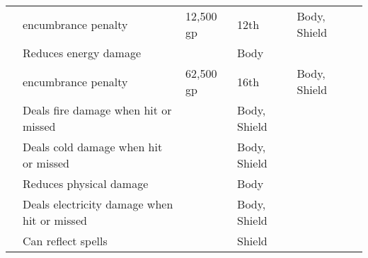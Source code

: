 \begin{longtabuwrapper}
\begin{longtabu}{l X l l l l}
                  &  encumbrance penalty & 12,500 gp & 12th & Body, Shield &  \\
                 & Reduces energy damage &  & Body &  \\
                  &  encumbrance penalty & 62,500 gp & 16th & Body, Shield &  \\
                 & Deals fire damage when hit or missed &  & Body, Shield &  \\
                 & Deals cold damage when hit or missed &  & Body, Shield &  \\
                 & Reduces physical damage &  & Body &  \\
                 & Deals electricity damage when hit or missed &  & Body, Shield &  \\
                 & Can reflect spells &  & Shield &  \\


\end{longtabu}
\end{longtabuwrapper}
